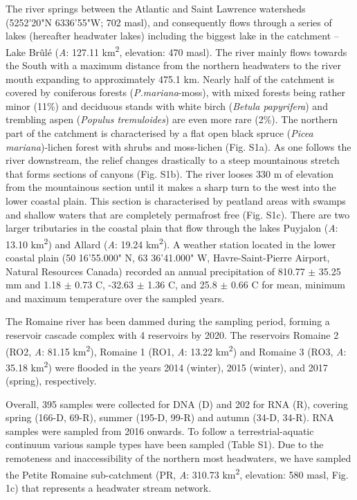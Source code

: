 \documentclass[12pt,a4paper]{article} %
\begin{document}
The river springs between the Atlantic and Saint Lawrence watersheds (52\textdegree{}52'20"N 63\textdegree{}36'55"W; 702 masl), and consequently flows through a series of lakes (hereafter headwater lakes) including the biggest lake in the catchment – Lake Br\^{u}l\'{e} (\textit{A}: 127.11 km\textsuperscript{2}, elevation: 470 masl). The river mainly flows towards the South with a maximum distance from the northern headwaters to the river mouth expanding to approximately 475.1 km. Nearly half of the catchment is covered by coniferous forests (\textit{P.mariana}-moss), with mixed forests being rather minor (11\%) and deciduous stands with white birch (\textit{Betula papyrifera}) and trembling aspen (\textit{Populus tremuloides}) are even more rare (2\%)\citep{HQreport2009}. The northern part of the catchment is characterised by a flat open black spruce (\textit{Picea mariana})-lichen forest with shrubs and moss-lichen (Fig. S1a). As one follows the river downstream, the relief changes drastically to a steep mountainous stretch that forms sections of canyons (Fig. S1b). The river looses 330 m of elevation from the mountainous section until it makes a sharp turn to the west into the lower coastal plain. This section is characterised by peatland areas with swamps and shallow waters that are completely permafrost free (Fig. S1c). There are two larger tributaries in the coastal plain that flow through the lakes Puyjalon (\textit{A}: 13.10 km\textsuperscript{2}) and Allard (\textit{A}: 19.24 km\textsuperscript{2}). A weather station located in the lower coastal plain (50\textdegree{} 16'55.000" N, 63\textdegree{} 36'41.000" W, Havre-Saint-Pierre Airport, Natural Resources Canada) recorded an annual precipitation of 810.77 $\pm$ 35.25 mm and 1.18 $\pm$ 0.73 \textdegree{}C, -32.63 $\pm$ 1.36 \textdegree{}C, and 25.8 $\pm$ 0.66 \textdegree{}C for mean, minimum and maximum temperature over the sampled years. 

The Romaine river has been dammed during the sampling period, forming a reservoir cascade complex with 4 reservoirs by 2020. The reservoirs Romaine 2 (RO2, \textit{A}: 81.15 km\textsuperscript{2}), Romaine 1 (RO1, \textit{A}: 13.22 km\textsuperscript{2}) and Romaine 3 (RO3, \textit{A}: 35.18 km\textsuperscript{2}) were flooded in the years 2014 (winter), 2015 (winter), and 2017 (spring), respectively.

Overall, 395 samples were collected for DNA (D) and 202 for RNA (R), covering spring (166-D, 69-R), summer (195-D, 99-R) and autumn (34-D, 34-R). RNA samples were sampled from 2016 onwards. To follow a terrestrial-aquatic continuum various sample types have been sampled (Table S1). Due to the remoteness and inaccessibility of the northern most headwaters, we have sampled the Petite Romaine sub-catchment (PR, \textit{A}: 310.73 km\textsuperscript{2}, elevation: 580 masl, Fig. 1c) that represents a headwater stream network. 
\end{document}
